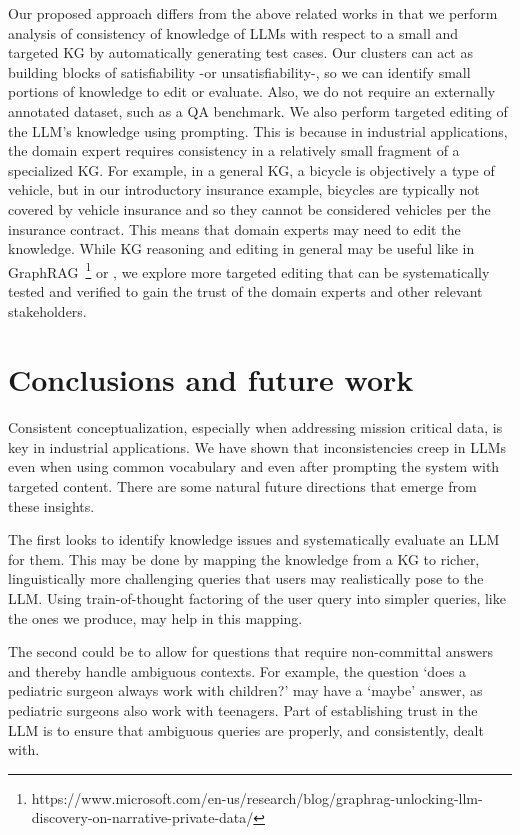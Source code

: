 \documentclass{article} %
\begin{document}
Our proposed approach differs from the above related works in that we perform analysis of consistency of knowledge of LLMs with respect to a small and targeted KG by automatically generating test cases. Our clusters can act as building blocks of satisfiability -or unsatisfiability-, so we can identify small portions of knowledge to edit or evaluate. Also, we do not require an externally annotated dataset, such as a QA benchmark. We also perform targeted editing of the LLM's knowledge using prompting. This is because in industrial applications, the domain expert requires consistency in a relatively small fragment of a specialized KG. For example, in a general KG, a bicycle is objectively a type of vehicle, but in our introductory insurance example, bicycles are typically not covered by vehicle insurance and so they cannot be considered vehicles per the insurance contract. This means that domain experts may need to edit the knowledge. While KG reasoning and editing in general may be useful like in  GraphRAG~\footnote{https://www.microsoft.com/en-us/research/blog/graphrag-unlocking-llm-discovery-on-narrative-private-data/} or \citep{reasoningOnGraphs}, we explore more targeted editing that can be systematically tested and verified to gain the trust of the domain experts and other relevant stakeholders. 

\section{Conclusions and future work}
\label{sec:future_dir}

Consistent conceptualization, especially when addressing mission critical data, is key in industrial applications. We have shown that inconsistencies creep in LLMs even when using common vocabulary and even after prompting the system with targeted content. There are some natural future directions that emerge from these insights.

The first looks to identify knowledge issues and systematically evaluate an LLM for them. This may be done by mapping the knowledge from a KG to richer, linguistically more challenging queries that users may realistically pose to the LLM. Using train-of-thought factoring of the user query into simpler queries, like the ones we produce, may help in this mapping.

The second could be to allow for questions that require non-committal answers and thereby handle ambiguous contexts. For example, the question `does a pediatric surgeon always work with children?' may have a `maybe' answer, as pediatric surgeons also work with teenagers. Part of establishing trust in the LLM is to ensure that ambiguous queries are properly, and consistently, dealt with. 
\end{document}
